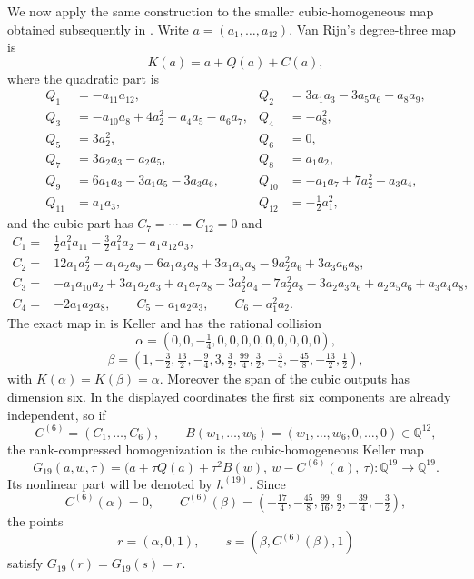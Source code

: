 \documentclass[11pt]{article}
\theoremstyle{remark}
\newcommand{\Q}{\mathbb{Q}}
\begin{document}
We now apply the same construction to the smaller cubic-homogeneous map obtained subsequently in \citet{vanRijn12var2026}. Write $a=(a_1,\ldots,a_{12})$. Van Rijn's degree-three map is
\[
K(a)=a+Q(a)+C(a),
\]
where the quadratic part is
\begin{align*}
Q_1&=-a_{11}a_{12}, & Q_2&=3a_1a_3-3a_5a_6-a_8a_9,\\
Q_3&=-a_{10}a_8+4a_2^2-a_4a_5-a_6a_7, & Q_4&=-a_8^2,\\
Q_5&=3a_2^2, & Q_6&=0,\\
Q_7&=3a_2a_3-a_2a_5, & Q_8&=a_1a_2,\\
Q_9&=6a_1a_3-3a_1a_5-3a_3a_6, & Q_{10}&=-a_1a_7+7a_2^2-a_3a_4,\\
Q_{11}&=a_1a_3, & Q_{12}&=-\tfrac12a_1^2,
\end{align*}
and the cubic part has $C_7=\cdots=C_{12}=0$ and
\begin{align*}
C_1={}&\tfrac12a_1^2a_{11}-\tfrac32a_1^2a_2-a_1a_{12}a_3,\\
C_2={}&12a_1a_2^2-a_1a_2a_9-6a_1a_3a_8+3a_1a_5a_8-9a_2^2a_6+3a_3a_6a_8,\\
C_3={}&-a_1a_{10}a_2+3a_1a_2a_3+a_1a_7a_8-3a_2^2a_4-7a_2^2a_8-3a_2a_3a_6+a_2a_5a_6+a_3a_4a_8,\\
C_4={}&-2a_1a_2a_8,\qquad C_5=a_1a_2a_3,\qquad C_6=a_1^2a_2.
\end{align*}
The exact map in \citet{vanRijn12var2026} is Keller and has the rational collision
\begin{equation}\label{eq:alpha}
\alpha=(0,0,-\tfrac14,0,0,0,0,0,0,0,0,0),
\end{equation}
\begin{equation}\label{eq:beta}
\beta=(1,-\tfrac32,\tfrac{13}{2},-\tfrac94,3,\tfrac32,\tfrac{99}{4},\tfrac32,-\tfrac34,-\tfrac{45}{8},-\tfrac{13}{2},\tfrac12),
\end{equation}
with $K(\alpha)=K(\beta)=\alpha$. Moreover the span of the cubic outputs has dimension six. In the displayed coordinates the first six components are already independent, so if
\[
C^{(6)}=(C_1,\ldots,C_6),\qquad B(w_1,\ldots,w_6)=(w_1,\ldots,w_6,0,\ldots,0)\in\Q^{12},
\]
the rank-compressed homogenization is the cubic-homogeneous Keller map
\begin{equation}\label{eq:G19}
G_{19}(a,w,\tau)=\bigl(a+\tau Q(a)+\tau^2B(w),\ w-C^{(6)}(a),\ \tau\bigr)\colon\Q^{19}\longrightarrow\Q^{19}.
\end{equation}
Its nonlinear part will be denoted by $h^{(19)}$. Since
\[
C^{(6)}(\alpha)=0,\qquad
C^{(6)}(\beta)=\left(-\tfrac{17}{4},-\tfrac{45}{8},\tfrac{99}{16},\tfrac92,-\tfrac{39}{4},-\tfrac32\right),
\]
the points
\begin{equation}\label{eq:rs}
r=(\alpha,0,1),\qquad s=(\beta,C^{(6)}(\beta),1)
\end{equation}
satisfy $G_{19}(r)=G_{19}(s)=r$.
\end{document}
